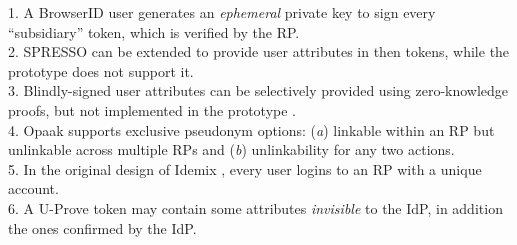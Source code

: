\begin{table}[tb]
{1. A BrowserID user generates an \emph{ephemeral} private key to sign every ``subsidiary'' token,
 which is verified by the RP.\\
2. SPRESSO can be extended to provide user attributes in then tokens, while the prototype does not support it.\\
3. Blindly-signed user attributes can be selectively provided using zero-knowledge proofs,
    but not implemented in the prototype \cite{PseudoID}.\\
4. Opaak supports exclusive pseudonym options: (\emph{a}) linkable within an RP but unlinkable across multiple RPs and (\emph{b}) unlinkability for any two actions.\\
5. In the original design of Idemix \cite{idemix}, every user logins to an RP with a unique account.\\
6. A U-Prove token may contain some attributes \emph{invisible} to the IdP, in addition the ones confirmed by the IdP.}
\end{table}


